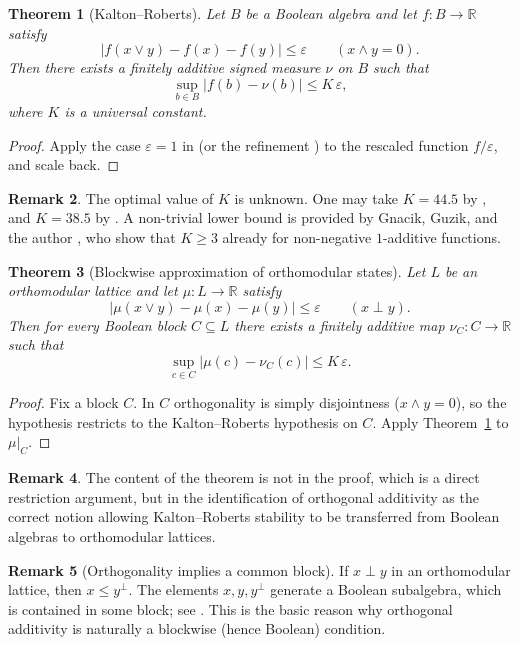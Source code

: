\documentclass[11pt]{amsart}
\newtheorem{theorem}{Theorem}[section]
\theoremstyle{definition}
\newtheorem{remark}[theorem]{Remark}
\newcommand{\join}{\vee}
\newcommand{\meet}{\wedge}
\begin{document}
\begin{theorem}[Kalton--Roberts]\label{thm:KR}
Let $B$ be a Boolean algebra and let $f\colon B\to\mathbb{R}$ satisfy
\[
\bigl|f(x\join y)-f(x)-f(y)\bigr|\le \varepsilon\qquad(x\meet y=0).
\]
Then there exists a finitely additive signed measure $\nu$ on $B$ such that 
\[
    \sup_{b\in B}|f(b)-\nu(b)|\le K\,\varepsilon,
\]
where $K$ is a universal constant.
\end{theorem}

\begin{proof}
Apply the case $\varepsilon=1$ in \cite{KR} (or the refinement \cite{BPR}) to the rescaled function $f/\varepsilon$, and scale back.
\end{proof}

\begin{remark}
The optimal value of $K$ is unknown. One may take $K=44.5$ by \cite{KR,BKP}, and $K=38.5$ by \cite{BPR}. A non-trivial lower bound is provided by Gnacik, Guzik, and the author \cite{GGK}, who show that $K\ge 3$ already for non-negative $1$-additive functions.
\end{remark}

\begin{theorem}[Blockwise approximation of orthomodular states]\label{thm:blockwise-states}
Let $L$ be an orthomodular lattice and let $\mu\colon L\to\mathbb{R}$ satisfy
\[
\bigl|\mu(x\join y)-\mu(x)-\mu(y)\bigr|\le \varepsilon\qquad(x\perp y).
\]
Then for every Boolean block $C\subseteq L$ there exists a finitely additive map $\nu_C\colon C\to\mathbb{R}$ such that
\[
\sup_{c\in C}|\mu(c)-\nu_C(c)|\le K\,\varepsilon.
\]
\end{theorem}

\begin{proof}
Fix a block $C$.
In $C$ orthogonality is simply disjointness ($x\meet y=0$), so the hypothesis restricts to the Kalton--Roberts hypothesis on $C$.
Apply Theorem~\ref{thm:KR} to $\mu|_C$.
\end{proof}

\begin{remark}
The content of the theorem is not in the proof, which is a direct restriction argument,
but in the identification of orthogonal additivity as the correct notion allowing
Kalton--Roberts stability to be transferred from Boolean algebras to orthomodular lattices.
\end{remark}

\begin{remark}[Orthogonality implies a common block]
If $x\perp y$ in an orthomodular lattice, then $x\le y^\perp$.
The elements $x,y,y^\perp$ generate a Boolean subalgebra, which is contained in some block; see \cite[Chapter~2]{Kalmbach}.
This is the basic reason why orthogonal additivity is naturally a blockwise (hence Boolean) condition.
\end{remark}
\end{document}
